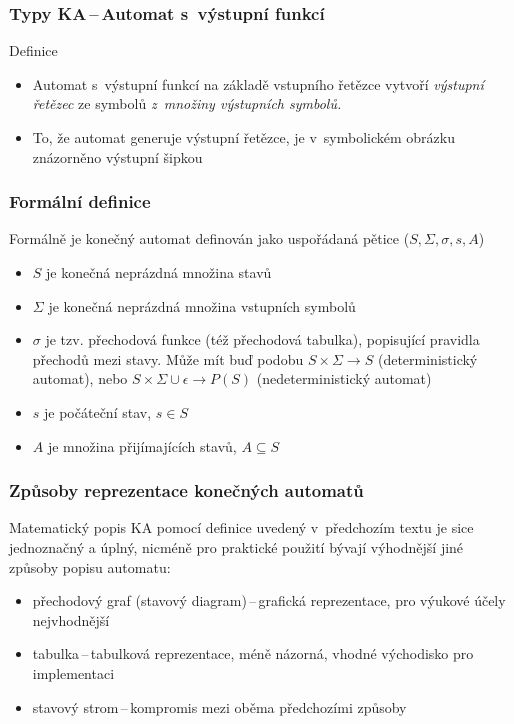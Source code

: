 \documentclass[hyperref={unicode}]{beamer}
\begin{document}
\begin{frame}
\transblindshorizontal
\frametitle{Typy KA\,--\,Automat s~výstupní funkcí }
\begin{block}{Definice}
\begin{itemize}
\item{Automat s~výstupní funkcí na základě vstupního řetězce vytvoří \textit{výstupní řetězec} ze symbolů \textit{z~množiny výstupních symbolů.}}
\item{To, že automat generuje výstupní řetězce, je v~symbolickém obrázku znázorněno výstupní šipkou}
\end{itemize}
\end{block}
\begin{figure}[h]
		\centering
\end{figure}
\end{frame}
\begin{frame}
\transblindshorizontal
\frametitle{Formální definice}
Formálně je konečný automat definován jako uspořádaná pětice ($S, \Sigma, \sigma, s, A$)
\begin{itemize}
\item{$S$ je konečná neprázdná množina stavů}
\item{$\Sigma$ je konečná neprázdná množina vstupních symbolů}
\item{$\sigma$ je tzv. přechodová funkce (též přechodová tabulka), popisující pravidla přechodů mezi stavy. Může mít buď podobu $S \times \Sigma \rightarrow S$ (deterministický automat), nebo $S \times {\Sigma \cup \epsilon} \rightarrow P(S)$ (nedeterministický automat)}
\item{$s$ je počáteční stav, $s \in S$}
\item{$A$ je množina přijímajících stavů, $A \subseteq S$ }
\end{itemize}
\end{frame}
\begin{frame}
\transblindshorizontal
\frametitle{Způsoby reprezentace konečných automatů}
\begin{block}{}
Matematický popis KA pomocí definice uvedený v~předchozím textu je sice jednoznačný a úplný, nicméně pro praktické použití bývají výhodnější jiné způsoby popisu automatu:
\begin{itemize}
\item{přechodový graf (stavový diagram)\,--\,grafická reprezentace, pro výukové účely nejvhodnější}
\item{tabulka\,--\,tabulková reprezentace, méně názorná, vhodné východisko pro implementaci}
\item{stavový strom\,--\,kompromis mezi oběma předchozími způsoby}
\end{itemize}
\end{block}
\end{frame}
\end{document}
